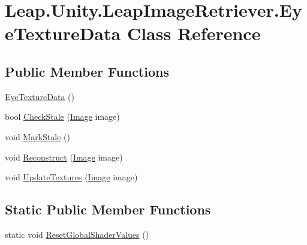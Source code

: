 \hypertarget{class_leap_1_1_unity_1_1_leap_image_retriever_1_1_eye_texture_data}{}\section{Leap.\+Unity.\+Leap\+Image\+Retriever.\+Eye\+Texture\+Data Class Reference}
\label{class_leap_1_1_unity_1_1_leap_image_retriever_1_1_eye_texture_data}
\subsection*{Public Member Functions}
\begin{DoxyCompactItemize}
\item 
\mbox{\hyperlink{class_leap_1_1_unity_1_1_leap_image_retriever_1_1_eye_texture_data_a0e0cda447dce9a396814be0bd1903c32}{Eye\+Texture\+Data}} ()
\item 
bool \mbox{\hyperlink{class_leap_1_1_unity_1_1_leap_image_retriever_1_1_eye_texture_data_a06df67c9881e8f29146403560a99c877}{Check\+Stale}} (\mbox{\hyperlink{class_leap_1_1_image}{Image}} image)
\item 
void \mbox{\hyperlink{class_leap_1_1_unity_1_1_leap_image_retriever_1_1_eye_texture_data_a1810624815db23fb176b37c27873d7c6}{Mark\+Stale}} ()
\item 
void \mbox{\hyperlink{class_leap_1_1_unity_1_1_leap_image_retriever_1_1_eye_texture_data_a3676c856cf9c84a9e88e73739d1ffeac}{Reconstruct}} (\mbox{\hyperlink{class_leap_1_1_image}{Image}} image)
\item 
void \mbox{\hyperlink{class_leap_1_1_unity_1_1_leap_image_retriever_1_1_eye_texture_data_a00b7969341b2baf7aaff8dd8863042dd}{Update\+Textures}} (\mbox{\hyperlink{class_leap_1_1_image}{Image}} image)
\end{DoxyCompactItemize}
\subsection*{Static Public Member Functions}
\begin{DoxyCompactItemize}
\item 
static void \mbox{\hyperlink{class_leap_1_1_unity_1_1_leap_image_retriever_1_1_eye_texture_data_ade1d4ec6e9d6b0ebb4aa394ff415af35}{Reset\+Global\+Shader\+Values}} ()
\end{DoxyCompactItemize}
